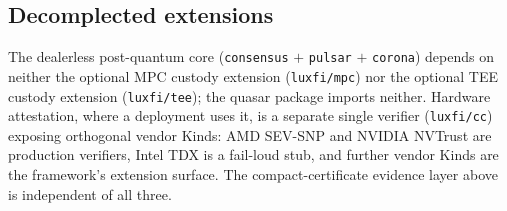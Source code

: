 \subsection{Decomplected extensions}
\label{sec:compact-cert:decomplect}

The dealerless post-quantum core (\texttt{consensus} $+$ \texttt{pulsar} $+$
\texttt{corona}) depends on neither the optional MPC custody extension
(\texttt{luxfi/mpc}) nor the optional TEE custody extension
(\texttt{luxfi/tee}); the quasar package imports neither. Hardware
attestation, where a deployment uses it, is a separate single verifier
(\texttt{luxfi/cc}) exposing orthogonal vendor Kinds: AMD SEV-SNP and NVIDIA
NVTrust are production verifiers, Intel TDX is a fail-loud stub, and further
vendor Kinds are the framework's extension surface. The compact-certificate
evidence layer above is independent of all three.

